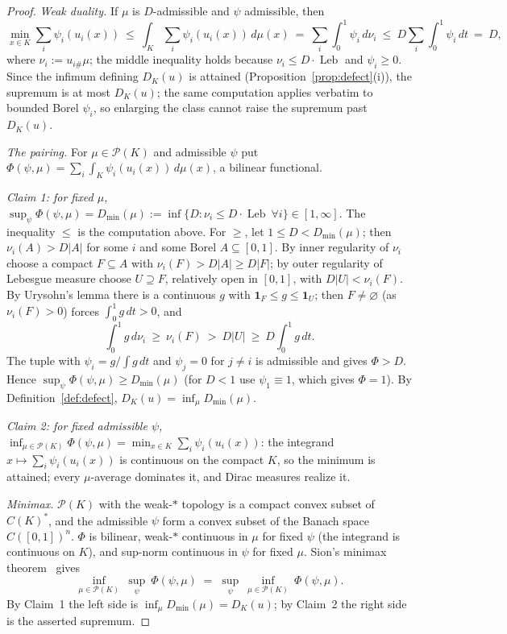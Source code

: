 \documentclass[11pt,reqno]{amsart}
\theoremstyle{plain}
\theoremstyle{definition}
\theoremstyle{remark}
\newcommand{\Leb}{\operatorname{Leb}}
\begin{document}
\begin{proof}
\emph{Weak duality.} If $\mu$ is $D$-admissible and $\psi$ admissible, then
\[
\min_{x\in K}\sum_i\psi_i(u_i(x))\ \le\
\int_K\sum_i\psi_i(u_i(x))\,d\mu(x)\ =\ \sum_i\int_0^1\psi_i\,d\nu_i\ \le\
D\sum_i\int_0^1\psi_i\,dt\ =\ D,
\]
where $\nu_i:=u_{i\#}\mu$; the middle inequality holds because
$\nu_i\le D\cdot\Leb$ and $\psi_i\ge0$. Since the infimum defining $D_K(u)$ is
attained (Proposition~\ref{prop:defect}(i)), the supremum is at most
$D_K(u)$; the same computation applies verbatim to bounded Borel $\psi_i$, so
enlarging the class cannot raise the supremum past $D_K(u)$.

\emph{The pairing.} For $\mu\in\mathcal P(K)$ and admissible $\psi$ put
$\Phi(\psi,\mu)=\sum_i\int_K\psi_i(u_i(x))\,d\mu(x)$, a bilinear functional.

\emph{Claim 1: for fixed $\mu$,}
$\sup_\psi\Phi(\psi,\mu)=D_{\min}(\mu):=\inf\{D:\nu_i\le D\cdot\Leb\ \forall
i\}\in[1,\infty]$. The inequality $\le$ is the computation above. For $\ge$,
let $1\le D<D_{\min}(\mu)$; then $\nu_i(A)>D|A|$ for some $i$ and some Borel
$A\subseteq[0,1]$. By inner regularity of $\nu_i$ choose a compact $F\subseteq
A$ with $\nu_i(F)>D|A|\ge D|F|$; by outer regularity of Lebesgue measure
choose $U\supseteq F$, relatively open in $[0,1]$, with $D|U|<\nu_i(F)$. By
Urysohn's lemma there is a continuous $g$ with
$\mathbf1_F\le g\le\mathbf1_U$; then $F\ne\varnothing$ (as $\nu_i(F)>0$)
forces $\int_0^1g\,dt>0$, and
\[
\int_0^1 g\,d\nu_i\ \ge\ \nu_i(F)\ >\ D|U|\ \ge\ D\int_0^1g\,dt .
\]
The tuple with $\psi_i=g/\int g\,dt$ and $\psi_j=0$ for $j\ne i$ is
admissible and gives $\Phi>D$. Hence $\sup_\psi\Phi(\psi,\mu)\ge D_{\min}(\mu)$
(for $D<1$ use $\psi_1\equiv1$, which gives $\Phi=1$). By
Definition~\ref{def:defect}, $D_K(u)=\inf_{\mu}D_{\min}(\mu)$.

\emph{Claim 2: for fixed admissible $\psi$,}
$\inf_{\mu\in\mathcal P(K)}\Phi(\psi,\mu)=\min_{x\in
K}\sum_i\psi_i(u_i(x))$: the integrand $x\mapsto\sum_i\psi_i(u_i(x))$ is
continuous on the compact $K$, so the minimum is attained; every
$\mu$-average dominates it, and Dirac measures realize it.

\emph{Minimax.} $\mathcal P(K)$ with the weak-$*$ topology is a compact
convex subset of $C(K)^*$, and the admissible $\psi$ form a convex subset of
the Banach space $C([0,1])^n$. $\Phi$ is bilinear, weak-$*$ continuous in
$\mu$ for fixed $\psi$ (the integrand is continuous on $K$), and sup-norm
continuous in $\psi$ for fixed $\mu$. Sion's minimax theorem~\cite{Sion58}
gives
\[
\inf_{\mu\in\mathcal P(K)}\ \sup_{\psi}\ \Phi(\psi,\mu)\;=\;
\sup_{\psi}\ \inf_{\mu\in\mathcal P(K)}\ \Phi(\psi,\mu).
\]
By Claim~1 the left side is $\inf_\mu D_{\min}(\mu)=D_K(u)$; by Claim~2 the
right side is the asserted supremum.
\end{proof}
\end{document}
